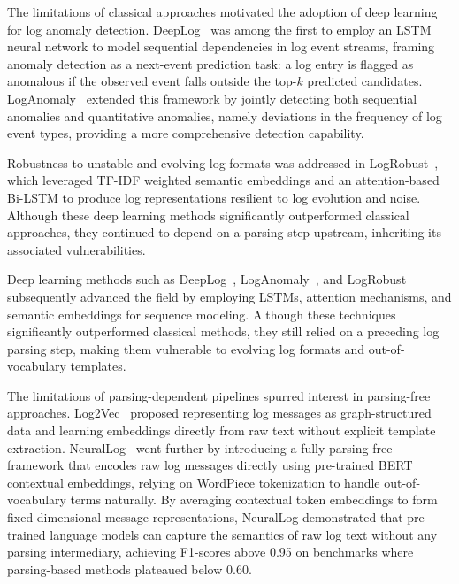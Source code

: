 The limitations of classical approaches motivated the adoption of deep learning for log anomaly detection. DeepLog~\cite{du2017deeplog} was among the first to employ an LSTM neural network to model sequential dependencies in log event streams, framing anomaly detection as a next-event prediction task: a log entry is flagged as anomalous if the observed event falls outside the top-$k$ predicted candidates. LogAnomaly~\cite{meng2019loganomaly} extended this framework by jointly detecting both sequential anomalies and quantitative anomalies, namely deviations in the frequency of log event types, providing a more comprehensive detection capability.

Robustness to unstable and evolving log formats was addressed in LogRobust~\cite{zhang2019robust}, which leveraged TF-IDF weighted semantic embeddings and an attention-based Bi-LSTM to produce log representations resilient to log evolution and noise. Although these deep learning methods significantly outperformed classical approaches, they continued to depend on a parsing step upstream, inheriting its associated vulnerabilities.

Deep learning methods such as DeepLog~\cite{du2017deeplog}, LogAnomaly~\cite{meng2019loganomaly}, and LogRobust~\cite{zhang2019robust} subsequently advanced the field by employing LSTMs, attention mechanisms, and semantic embeddings for sequence modeling. Although these techniques significantly outperformed classical methods, they still relied on a preceding log parsing step, making them vulnerable to evolving log formats and out-of-vocabulary templates.


The limitations of parsing-dependent pipelines spurred interest in parsing-free approaches. Log2Vec~\cite{meng2020log2vec} proposed representing log messages as graph-structured data and learning embeddings directly from raw text without explicit template extraction. NeuralLog~\cite{neurallog2021} went further by introducing a fully parsing-free framework that encodes raw log messages directly using pre-trained BERT~\cite{devlin2018bert} contextual embeddings, relying on WordPiece tokenization to handle out-of-vocabulary terms naturally. By averaging contextual token embeddings to form fixed-dimensional message representations, NeuralLog demonstrated that pre-trained language models can capture the semantics of raw log text without any parsing intermediary, achieving F1-scores above 0.95 on benchmarks where parsing-based methods plateaued below 0.60.

